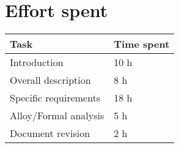 \chapter{Effort spent}
\begin{tabular}{|l|l|}
	\hline
	Task & Time spent\\
	\hline
	Introduction & 10 h\\
	\hline
	Overall description & 8 h\\
	\hline
	Specific requirements & 18 h\\
	\hline
	Alloy/Formal analysis & 5 h\\
	\hline
	Document revision & 2 h\\
	\hline
\end{tabular}